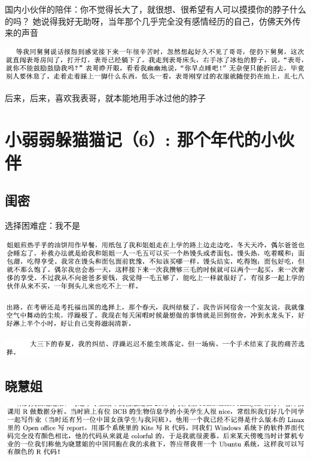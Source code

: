 \documentclass[9pt, b5paper]{article}
\begin{document}
国内小伙伴的陪伴：你不觉得长大了，就很想、很希望有人可以摸摸你的脖子什么的吗？
她说得我好无助呀，当年那个几乎完全没有感情经历的自己，仿佛天外传来的声音

\begin{center}
\includegraphics[width=.9\linewidth]{./pic/backups_plans_20210422_090034.png}
\end{center}

后来，后来，喜欢我表哥，就本能地用手冰过他的脖子

\section{小弱弱躲猫猫记（6）: 那个年代的小伙伴}
\label{sec:org4e9bda2}
\subsection{闺密}
\label{sec:org9df8a3d}
选择困难症：我不是

\begin{center}
\includegraphics[width=.9\linewidth]{./pic/backups_plans_20210422_100215.png}
\end{center}

\begin{center}
\includegraphics[width=.9\linewidth]{./pic/backups_plans_20210422_110112.png}
\end{center}
\begin{center}
\includegraphics[width=.9\linewidth]{./pic/backups_plans_20210422_110135.png}
\end{center}

\subsection{晓慧姐}
\label{sec:org1ca80a3}
\begin{center}
\includegraphics[width=.9\linewidth]{./pic/backups_plans_20210422_090457.png}
\end{center}
\end{document}
